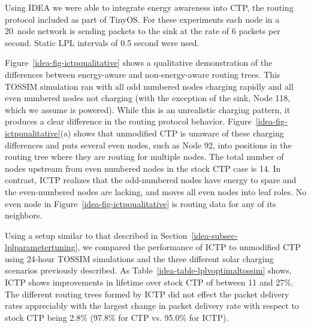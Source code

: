 Using IDEA we were able to integrate energy awareness into CTP, the routing
protocol included as part of TinyOS. For these experiments each node in a
20~node network is sending packets to the sink at the rate of 6 packets per
second. Static LPL intervals of 0.5 second were used. 

Figure~\ref{idea-fig-ictpqualitative} shows a qualitative demonstration of
the differences between energy-aware and non-energy-aware routing trees. This
TOSSIM simulation ran with all odd numbered nodes charging rapidly and all
even numbered nodes not charging (with the exception of the sink, Node 118,
which we assume is powered). While this is an unrealistic charging pattern,
it produces a clear difference in the routing protocol behavior.
Figure~\ref{idea-fig-ictpqualitative}(a) shows that unmodified CTP is unaware
of these charging differences and puts several even nodes, such as Node 92,
into positions in the routing tree where they are routing for multiple nodes.
The total number of nodes upstream from even numbered nodes in the stock CTP
case is 14. In contrast, ICTP realizes that the odd-numbered nodes have
energy to spare and the even-numbered nodes are lacking, and moves all even
nodes into leaf roles. No even node in Figure~\ref{idea-fig-ictpqualitative}
is routing data for any of its neighbors.

Using a setup similar to that described in
Section~\ref{idea-subsec-lplparametertuning}, we compared the performance of
ICTP to unmodified CTP using 24-hour TOSSIM simulations and the three
different solar charging scenarios previously described. As
Table~\ref{idea-table-lplvoptimaltossim} shows, ICTP shows improvements in
lifetime over stock CTP of between 11 and 27\%. The different routing trees
formed by ICTP did not effect the packet delivery rates appreciably with the
largest change in packet delivery rate with respect to stock CTP being 2.8\%
(97.8\% for CTP vs. 95.0\% for ICTP).

